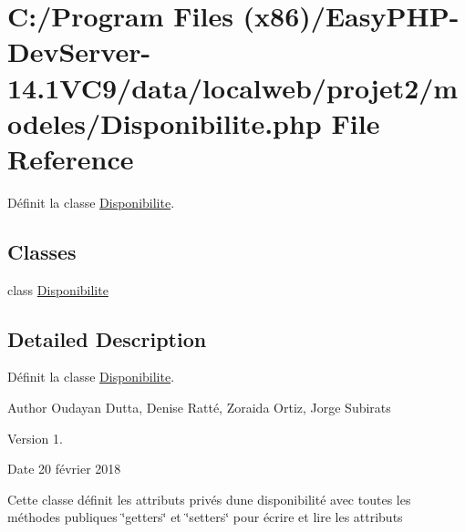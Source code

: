 \hypertarget{_disponibilite_8php}{}\section{C\+:/\+Program Files (x86)/\+Easy\+P\+H\+P-\/\+Dev\+Server-\/14.1\+V\+C9/data/localweb/projet2/modeles/\+Disponibilite.php File Reference}
\label{_disponibilite_8php}


Définit la classe \hyperlink{class_disponibilite}{Disponibilite}.  


\subsection*{Classes}
\begin{DoxyCompactItemize}
\item 
class \hyperlink{class_disponibilite}{Disponibilite}
\end{DoxyCompactItemize}


\subsection{Detailed Description}
Définit la classe \hyperlink{class_disponibilite}{Disponibilite}. 

\begin{DoxyAuthor}{Author}
Oudayan Dutta, Denise Ratté, Zoraida Ortiz, Jorge Subirats 
\end{DoxyAuthor}
\begin{DoxyVersion}{Version}
1. 
\end{DoxyVersion}
\begin{DoxyDate}{Date}
20 février 2018
\end{DoxyDate}
Cette classe définit les attributs privés d\textquotesingle{}une disponibilité avec toutes les méthodes publiques \char`\"{}getters\char`\"{} et \char`\"{}setters\char`\"{} pour écrire et lire les attributs 